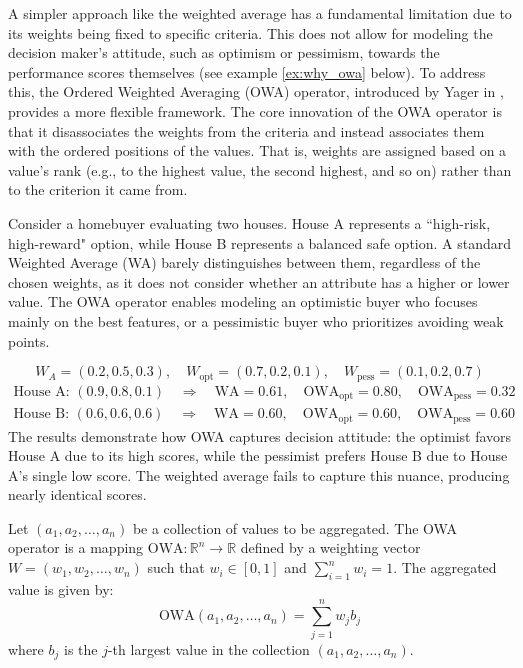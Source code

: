 A simpler approach like the weighted average has a fundamental limitation due to its weights being fixed to specific criteria. This does not allow for modeling the decision maker's attitude, such as optimism or pessimism, towards the performance scores themselves (see example \ref{ex:why_owa} below). To address this, the Ordered Weighted Averaging (OWA) operator, introduced by Yager in \cite{YagerOWA}, provides a more flexible framework. The core innovation of the OWA operator is that it disassociates the weights from the criteria and instead associates them with the ordered positions of the values. That is, weights are assigned based on a value's rank (e.g., to the highest value, the second highest, and so on) rather than to the criterion it came from.\\

\begin{example}\label{ex:why_owa}
    Consider a homebuyer evaluating two houses. House A represents a ``high-risk, high-reward" option, while House B represents a balanced safe option. A standard Weighted Average (WA) barely distinguishes between them, regardless of the chosen weights, as it does not consider whether an attribute has a higher or lower value. The OWA operator enables modeling an optimistic buyer who focuses mainly on the best features, or a pessimistic buyer who prioritizes avoiding weak points.

    \[W_A = (0.2, 0.5, 0.3), \quad W_{\text{opt}} = (0.7, 0.2, 0.1), \quad W_{\text{pess}} = (0.1, 0.2, 0.7) \]
    \begin{align*} 
    \text{House A: } (0.9, 0.8, 0.1)\quad  \Rightarrow \quad \text{WA} = 0.61,\quad  \text{OWA}_{\text{opt}} = 0.80, \quad  \text{OWA}_{\text{pess}} = 0.32 \\
    \text{House B: } (0.6, 0.6, 0.6) \quad \Rightarrow \quad \text{WA} = 0.60,\quad   \text{OWA}_{\text{opt}} = 0.60,  \quad \text{OWA}_{\text{pess}} = 0.60
    \end{align*}
    The results demonstrate how OWA captures decision attitude: the optimist favors House A due to its high scores, while the pessimist prefers House B due to House A's single low score. The weighted average fails to capture this nuance, producing nearly identical scores.
\end{example}

\begin{definition}
Let $(a_1, a_2, \dots, a_n)$ be a collection of values to be aggregated. The OWA operator is a mapping $\text{OWA}: \mathbb{R}^n \to \mathbb{R}$ defined by a weighting vector $W = (w_1, w_2, \dots, w_n)$ such that $w_i \in [0, 1]$ and $\sum_{i=1}^{n} w_i = 1$. The aggregated value is given by:
\[
\text{OWA}(a_1, a_2, \dots, a_n) = \sum_{j=1}^{n} w_j b_j
\]
where $b_j$ is the $j$-th largest value in the collection $(a_1, a_2, \dots, a_n)$.
\end{definition}

